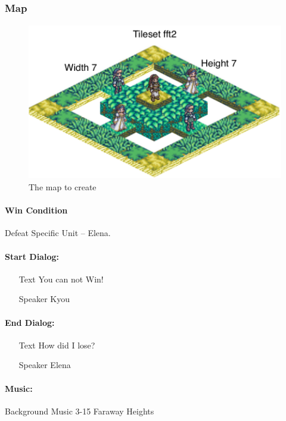 \subsubsection*{Map}
\begin{figure}[h!]
	\centering
		\includegraphics[height=2.7in]{figures/Task.pdf}
	\caption{The map to create}
	\label{fig:figures_Task}
\end{figure}


\paragraph{Win Condition\\}
Defeat Specific Unit   -- Elena.

\paragraph{Start Dialog:}
\begin{itemize}[topsep=0mm,noitemsep]
	\item[Text]  You can not Win!
	\item[Speaker] Kyou
\end{itemize}

\paragraph{End Dialog:}
\begin{itemize}[topsep=0mm,noitemsep]
	\item[Text]  How did I lose?
	\item[Speaker] Elena
\end{itemize}

\paragraph{Music:\\}
Background Music 3-15 Faraway Heights

